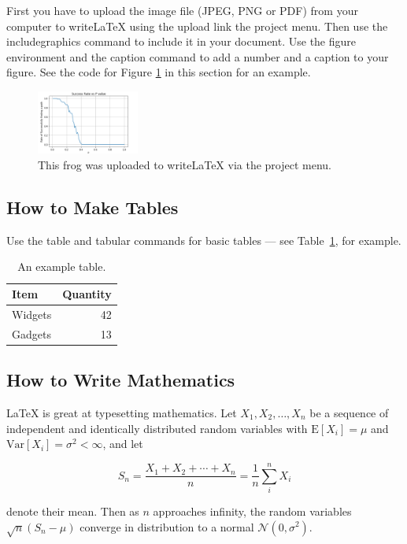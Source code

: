 \documentclass[letter]{article}
\begin{document}
First you have to upload the image file (JPEG, PNG or PDF) from your computer to writeLaTeX using the upload link the project menu. Then use the includegraphics command to include it in your document. Use the figure environment and the caption command to add a number and a caption to your figure. See the code for Figure \ref{fig:frog} in this section for an example.

\begin{figure}
\centering
\includegraphics[width=0.3\textwidth]{../pics/question3-1.png}
\caption{\label{fig:frog}This frog was uploaded to writeLaTeX via the project menu.}
\end{figure}

\subsection{How to Make Tables}

Use the table and tabular commands for basic tables --- see Table~\ref{tab:widgets}, for example.

\begin{table}
\centering
\begin{tabular}{l|r}
Item & Quantity \\\hline
Widgets & 42 \\
Gadgets & 13
\end{tabular}
\caption{\label{tab:widgets}An example table.}
\end{table}

\subsection{How to Write Mathematics}

\LaTeX{} is great at typesetting mathematics. Let $X_1, X_2, \ldots, X_n$ be a sequence of independent and identically distributed random variables with $\text{E}[X_i] = \mu$ and $\text{Var}[X_i] = \sigma^2 < \infty$, and let

\begin{equation}
S_n = \frac{X_1 + X_2 + \cdots + X_n}{n}
      = \frac{1}{n}\sum_{i}^{n} X_i
\label{eq:sn}
\end{equation}

denote their mean. Then as $n$ approaches infinity, the random variables $\sqrt{n}(S_n - \mu)$ converge in distribution to a normal $\mathcal{N}(0, \sigma^2)$.
\end{document}

